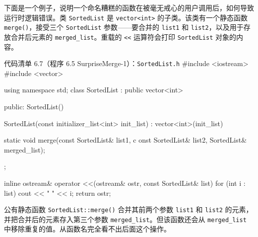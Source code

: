 下面是一个例子，说明一个命名糟糕的函数在被毫无戒心的用户调用后，如何导致运行时逻辑错误。类 \texttt{Sorted\allowbreak{}List} 是 \texttt{vector<int>} 的子类。该类有一个静态函数 \texttt{merge()}，接受三个 \texttt{Sorted\allowbreak{}List} 参数——要合并的 \texttt{list1} 和 \texttt{list2}，以及用于存放合并后元素的 \texttt{merged\_\allowbreak{}list}。重载的 \texttt{<<} 运算符会打印 \texttt{Sorted\allowbreak{}List} 对象的内容。

\begin{codeboxt}{代码清单 6.7（程序 6.5 SurpriseMerge-1）：\texttt{Sorted\allowbreak{}List.\allowbreak{}h}}
#include <iostream>
#include <vector>

using namespace std;
class SortedList : public vector<int>
{
public:
    SortedList() {}

    SortedList(const initializer_list<int> init_list)
        : vector<int>(init_list) {}

    static void merge(const SortedList& list1,
                      c
onst SortedList& list2,
                            SortedList& merged_list);
};

inline ostream& operator <<(ostream& ostr, const SortedList& list)
{
    for (int i : list) cout << " " << i;
    return ostr;
}
\end{codeboxt}

公有静态函数 \texttt{Sorted\allowbreak{}List::\allowbreak{}merge(\allowbreak{})\allowbreak{}} 合并其前两个参数 \texttt{list1} 和 \texttt{list2} 的元素，并把合并后的元素存入第三个参数 \texttt{merged\_\allowbreak{}list}。但该函数还会从 \texttt{merged\_\allowbreak{}list} 中移除重复的值。从函数名完全看不出后面这个操作。


